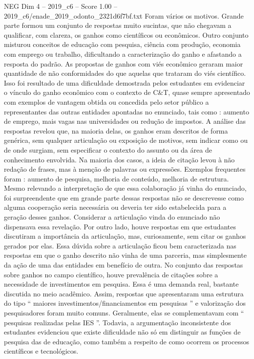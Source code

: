 \begin{textsample}{NEG Dim 4 – 2019\_c6 – Score 1.00 – 2019\_c6/enade\_2019\_odonto\_2321d6f7bf.txt}
Foram vários os motivos.
Grande parte formou um conjunto de respostas muito sucintas, que não chegavam a qualificar, com clareza, os ganhos como científicos ou econômicos.
Outro conjunto misturou conceitos de educação com pesquisa, ciência com produção, economia com emprego ou trabalho, dificultando a caracterização do ganho e afastando a resposta do padrão.
As propostas de ganhos com viés econômico geraram maior quantidade de não conformidades do que aquelas que trataram do viés científico.
Isso foi resultado de uma dificuldade demostrada pelos estudantes em evidenciar o vínculo do ganho econômico com o contexto de C\&T, quase sempre apresentado com exemplos de vantagem obtida ou concedida pelo setor público a representantes das outras entidades apontadas no enunciado, tais como : aumento de emprego, mais vagas nas universidades ou redução de impostos.
A análise das respostas revelou que, na maioria delas, os ganhos eram descritos de forma genérica, sem qualquer articulação ou exposição de motivos, sem indicar como ou de onde surgiam, sem especificar o contexto do assunto ou da área de conhecimento envolvida.
Na maioria dos casos, a ideia de citação levou à não redação de frases, mas à menção de palavras ou expressões.
Exemplos frequentes foram : aumento de pesquisa, melhoria de conteúdo, melhoria de estrutura.
Mesmo relevando a interpretação de que essa colaboração já vinha do enunciado, foi surpreendente que em grande parte dessas respostas não se descrevesse como alguma cooperação seria necessária ou deveria ter sido estabelecida para a geração desses ganhos.
Considerar a articulação vinda do enunciado não dispensava essa revelação.
Por outro lado, houve respostas em que estudantes discutiram a importância da articulação, mas, curiosamente, sem citar os ganhos gerados por elas.
Essa dúvida sobre a articulação ficou bem caracterizada nas respostas em que o ganho descrito não vinha de uma parceria, mas simplesmente da ação de uma das entidades em benefício de outra.
No conjunto das respostas sobre ganhos no campo científico, houve prevalência de citações sobre a necessidade de investimentos em pesquisa.
Essa é uma demanda real, bastante discutida no meio acadêmico.
Assim, respostas que apresentaram uma estrutura do tipo “ maiores investimentos/financiamentos em pesquisas ” e valorização dos pesquisadores foram muito comuns.
Geralmente, elas se complementavam com “ pesquisas realizadas pelas IES ”.
Todavia, a argumentação inconsistente dos estudantes evidenciou que existe dificuldade não só em distinguir as funções de pesquisa das de educação, como também a respeito de como ocorrem os processos científicos e tecnológicos.

\end{textsample}
